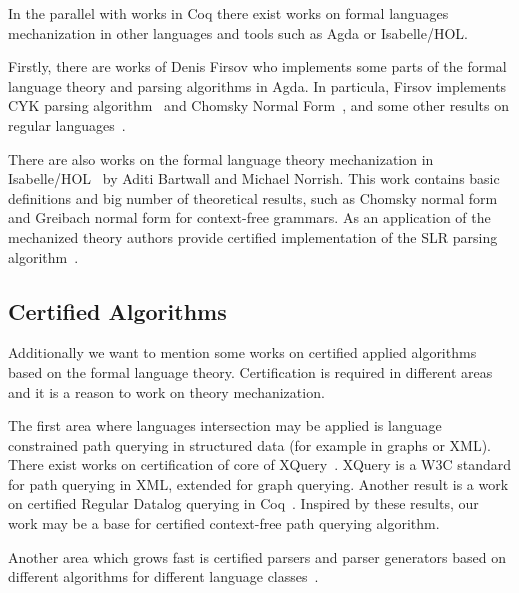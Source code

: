 In the parallel with works in Coq there exist works on formal languages mechanization in other languages and tools such as Agda or Isabelle/HOL.

Firstly, there are works of Denis Firsov who implements some parts of the formal language theory and parsing algorithms in Agda.
In particula, Firsov implements CYK parsing algorithm~\cite{firsov2014certified,firsov2016cfl} and Chomsky Normal Form~\cite{firsov2015certified}, and some other results on regular languages~\cite{10.1007/978-3-319-03545-1_7}.

There are also works on the formal language theory mechanization in Isabelle/HOL~\cite{1885-16399,barthwal2010formalisation,10.1007/978-3-642-13824-9_11} by Aditi Bartwall and Michael Norrish.
This work contains basic definitions and big number of theoretical results, such as Chomsky normal form and Greibach normal form for context-free grammars. 
As an application of the mechanized theory authors provide certified implementation of the SLR parsing algorithm~\cite{10.1007/978-3-642-00590-9_12}.

\subsection{Certified Algorithms}

Additionally we want to mention some works on certified applied algorithms based on the formal language theory.
Certification is required in different areas and it is a reason to work on theory mechanization.

The first area where languages intersection may be applied is language constrained path querying in structured data (for example in graphs or XML).
There exist works on certification of core of XQuery~\cite{10.1007/978-3-642-25379-9_21}. 
XQuery is a W3C standard for path querying in XML, extended for graph querying. 
Another result is a work on certified Regular Datalog querying in Coq~\cite{certifiedPrologGraphQuerying}. 
Inspired by these results, our work may be a base for certified context-free path querying algorithm.

Another area which grows fast is certified parsers and parser generators based on different algorithms for different language classes~\cite{10.1007/978-3-642-28869-2_20,bernardy2016certified,Lopes2016CertifiedDP,Gross2015ParsingPA}. 
